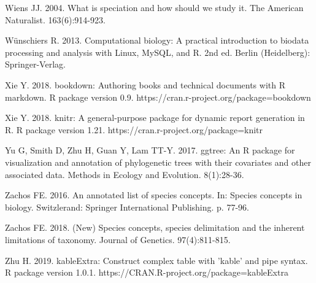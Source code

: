 Wiens JJ. 2004. What is speciation and how should we study it. The American Naturalist. 163(6):914-923.

Wünschiers R. 2013. Computational biology: A practical introduction to biodata processing and analysis with Linux, MySQL, and R. 2nd ed. Berlin (Heidelberg): Springer-Verlag.

Xie Y. 2018. bookdown: Authoring books and technical documents with R markdown. R package version 0.9. https://cran.r-project.org/package=bookdown
  
Xie Y. 2018. knitr: A general-purpose package for dynamic report generation in R. R package version 1.21. https://cran.r-project.org/package=knitr

Yu G, Smith D, Zhu H, Guan Y, Lam TT-Y. 2017. ggtree: An R package for visualization and annotation of phylogenetic trees with their covariates and other associated data. Methods in Ecology and Evolution. 8(1):28-36.

Zachos FE. 2016. An annotated list of species concepts. In: Species concepts in biology. Switzlerand: Springer International Publishing. p. 77-96.

Zachos FE. 2018. (New) Species concepts, species delimitation and the inherent limitations of taxonomy. Journal of Genetics. 97(4):811-815.

Zhu H. 2019. kableExtra: Construct complex table with 'kable' and pipe syntax. R package version 1.0.1. https://CRAN.R-project.org/package=kableExtra

\setlength{\parindent}{0em}
\setlength{\leftskip}{0em}
\setlength{\parskip}{6pt}
\doublespacing
